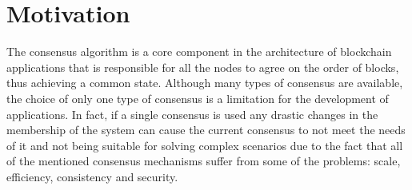 





\section{Motivation}
\label{sub:intro-motivation}



The consensus algorithm is a core component in the architecture of blockchain applications that is responsible for all the nodes to agree on the order of blocks, thus achieving a common state. Although many types of consensus are available, the choice of only one type of consensus is a limitation for the development of applications. In fact, if a single consensus is used any drastic changes in the membership of the system can cause the current consensus to not meet the needs of it and not being suitable for solving complex scenarios due to the fact that all of the mentioned consensus mechanisms suffer from some of the problems: scale, efficiency, consistency and security. %

